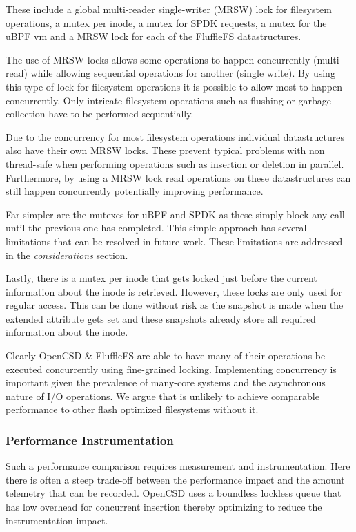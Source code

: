 These include a global multi-reader single-writer (MRSW) lock for filesystem
operations, a mutex per inode, a mutex for SPDK requests, a mutex for the uBPF
vm and a MRSW lock for each of the FluffleFS datastructures.

The use of MRSW locks allows some operations to happen concurrently (multi read)
while allowing sequential operations for another (single write). By using this
type of lock for filesystem operations it is possible to allow most to happen
concurrently. Only intricate filesystem operations such as flushing or garbage
collection have to be performed sequentially.

Due to the concurrency for most filesystem operations individual datastructures
also have their own MRSW locks. These prevent typical problems with non
thread-safe when performing operations such as insertion or deletion in
parallel. Furthermore, by using a MRSW lock read operations on these
datastructures can still happen concurrently potentially improving performance.

Far simpler are the mutexes for uBPF and SPDK as these simply block any call
until the previous one has completed. This simple approach has several
limitations that can be resolved in future work. These limitations are addressed
in the \textit{considerations} section.

Lastly, there is a mutex per inode that gets locked just before the current
information about the inode is retrieved. However, these locks are only used for
regular access. This can be done without risk as the snapshot is made when the
extended attribute gets set and these snapshots already store all required
information about the inode.

Clearly OpenCSD \& FluffleFS are able to have many of their operations be executed
concurrently using fine-grained locking. Implementing concurrency is important
given the prevalence of many-core systems and the asynchronous nature of I/O
operations. We argue that is unlikely to achieve comparable performance to other
flash optimized filesystems without it.

\subsubsection{Performance Instrumentation}

Such a performance comparison requires measurement and instrumentation. Here
there is often a steep trade-off between the performance impact and the amount
telemetry that can be recorded. OpenCSD uses a boundless lockless
queue \cite{Michael1996SimpleFA} that has low overhead for concurrent insertion
thereby optimizing to reduce the instrumentation impact.

